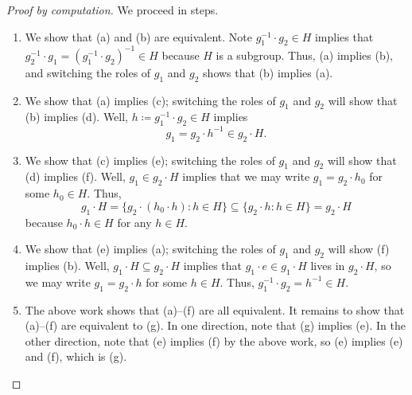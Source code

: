 \documentclass[../notes.tex]{subfiles}
\begin{document}
\begin{proof}[Proof by computation]
    We proceed in steps.
    \begin{enumerate}
        \item We show that (a) and (b) are equivalent. Note $g_1^{-1}\cdot g_2\in H$ implies that $g_2^{-1}\cdot g_1=\left(g_1^{-1}\cdot g_2\right)^{-1}\in H$ because $H$ is a subgroup. Thus, (a) implies (b), and switching the roles of $g_1$ and $g_2$ shows that (b) implies (a).
        \item We show that (a) implies (c); switching the roles of $g_1$ and $g_2$ will show that (b) implies (d). Well, $h\coloneqq g_1^{-1}\cdot g_2\in H$ implies
        \[g_1=g_2\cdot h^{-1}\in g_2\cdot H.\]
        \item We show that (c) implies (e); switching the roles of $g_1$ and $g_2$ will show that (d) implies (f). Well, $g_1\in g_2\cdot H$ implies that we may write $g_1=g_2\cdot h_0$ for some $h_0\in H$. Thus,
        \[g_1\cdot H=\{g_2\cdot(h_0\cdot h):h\in H\}\subseteq\{g_2\cdot h:h\in H\}=g_2\cdot H\]
        because $h_0\cdot h\in H$ for any $h\in H$.
        \item We show that (e) implies (a); switching the roles of $g_1$ and $g_2$ will show (f) implies (b). Well, $g_1\cdot H\subseteq g_2\cdot H$ implies that $g_1\cdot e\in g_1\cdot H$ lives in $g_2\cdot H$, so we may write $g_1=g_2\cdot h$ for some $h\in H$. Thus, $g_1^{-1}\cdot g_2=h^{-1}\in H$.
        \item The above work shows that (a)--(f) are all equivalent. It remains to show that (a)--(f) are equivalent to (g). In one direction, note that (g) implies (e). In the other direction, note that (e) implies (f) by the above work, so (e) implies (e) and (f), which is (g).
        \qedhere
    \end{enumerate}
\end{proof}
\end{document}
